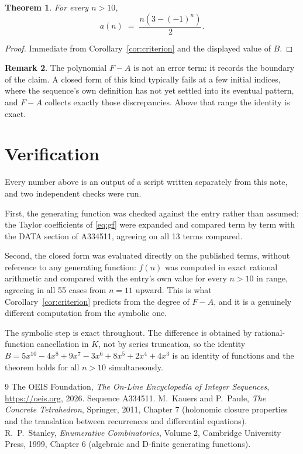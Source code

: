 \documentclass[11pt,a4paper]{article}
\theoremstyle{plain}
\newtheorem{theorem}{Theorem}
\theoremstyle{definition}
\newtheorem{remark}[theorem]{Remark}
\begin{document}
\begin{theorem}
For every $n>10$,
\[
a(n)\;=\;\frac{n \left(3 - \left(-1\right)^{n}\right)}{2} .
\]
\end{theorem}

\begin{proof}
Immediate from Corollary~\ref{cor:criterion} and the displayed value of $B$.
\end{proof}

\begin{remark}
The polynomial $F-A$ is not an error term: it records the boundary of the claim. A closed
form of this kind typically fails at a few initial indices, where the sequence's own
definition has not yet settled into its eventual pattern, and $F-A$ collects exactly
those discrepancies. Above that range the identity is exact.
\end{remark}

\section{Verification}

Every number above is an output of a script written separately from this note, and two
independent checks were run.

First, the generating function was checked against the entry rather than assumed: the
Taylor coefficients of \eqref{eq:gf} were expanded and compared term by term with the DATA
section of A334511, agreeing on all 13 terms compared.

Second, the closed form was evaluated directly on the published terms, without reference
to any generating function: $f(n)$ was computed in exact rational arithmetic and compared
with the entry's own value for every $n>10$ in range, agreeing in all 55 cases
from $n=11$ upward. This is what Corollary~\ref{cor:criterion} predicts from the
degree of $F-A$, and it is a genuinely different computation from the symbolic one.

The symbolic step is exact throughout. The difference is obtained by rational-function
cancellation in $K$, not by series truncation, so the identity $B=5 x^{10} - 4 x^{8} + 9 x^{7} - 3 x^{6} + 8 x^{5} + 2 x^{4} + 4 x^{3}$ is an
identity of functions and the theorem holds for all $n>10$ simultaneously.

\begin{thebibliography}{9}
 The OEIS Foundation, \emph{The On-Line Encyclopedia of Integer Sequences},
\url{https://oeis.org}, 2026. Sequence A334511.
 M.~Kauers and P.~Paule, \emph{The Concrete Tetrahedron}, Springer, 2011,
Chapter 7 (holonomic closure properties and the translation between recurrences and
differential equations).
 R.~P.~Stanley, \emph{Enumerative Combinatorics}, Volume 2, Cambridge
University Press, 1999, Chapter 6 (algebraic and D-finite generating functions).
\end{thebibliography}
\end{document}
